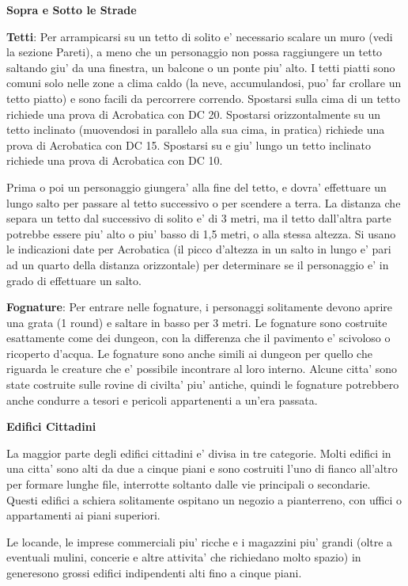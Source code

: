 \documentclass[a4paper,11pt,twoside,openany]{book}
\begin{document}
{\textbf{Sopra e Sotto le Strade}

\textbf{Tetti}: Per arrampicarsi su un tetto di solito e' necessario scalare un muro (vedi la sezione Pareti), a meno che un personaggio non possa raggiungere un tetto saltando giu' da una finestra, un balcone o un ponte piu' alto. I tetti piatti sono comuni solo nelle zone a clima caldo (la neve, accumulandosi, puo' far crollare un tetto piatto) e sono facili da percorrere correndo. Spostarsi sulla cima di un tetto richiede una prova di Acrobatica con DC 20. Spostarsi orizzontalmente su un tetto inclinato (muovendosi in parallelo alla sua cima, in pratica) richiede una prova di Acrobatica con DC 15. Spostarsi su e giu' lungo un tetto inclinato richiede una prova di Acrobatica con DC 10.

Prima o poi un personaggio giungera' alla fine del tetto, e dovra' effettuare un lungo salto per passare al tetto successivo o per scendere a terra. La distanza che separa un tetto dal successivo di solito e' di 3 metri, ma il tetto dall'altra parte potrebbe essere piu' alto o piu' basso di 1,5 metri, o alla stessa altezza. Si usano le indicazioni date per Acrobatica (il picco d'altezza in un salto in lungo e' pari ad un quarto della distanza orizzontale) per determinare se il personaggio e' in grado di effettuare un salto.

\textbf{Fognature}: Per entrare nelle fognature, i personaggi solitamente devono aprire una grata (1 round) e saltare in basso per 3 metri. Le fognature sono costruite esattamente come dei dungeon, con la differenza che il pavimento e' scivoloso o ricoperto d'acqua. Le fognature sono anche simili ai dungeon per quello che riguarda le creature che e' possibile incontrare al loro interno. Alcune citta' sono state costruite sulle rovine di civilta' piu' antiche, quindi le fognature potrebbero anche condurre a tesori e pericoli appartenenti a un'era passata.

\textbf{Edifici Cittadini}

La maggior parte degli edifici cittadini e' divisa in tre categorie. Molti edifici in una citta' sono alti da due a cinque piani e sono costruiti l'uno di fianco all'altro per formare lunghe file, interrotte soltanto dalle vie principali o secondarie. Questi edifici a schiera solitamente ospitano un negozio a pianterreno, con uffici o appartamenti ai piani superiori.

Le locande, le imprese commerciali piu' ricche e i magazzini piu' grandi (oltre a eventuali mulini, concerie e altre attivita' che richiedano molto spazio) in generesono grossi edifici indipendenti alti fino a cinque piani.

}
\end{document}
